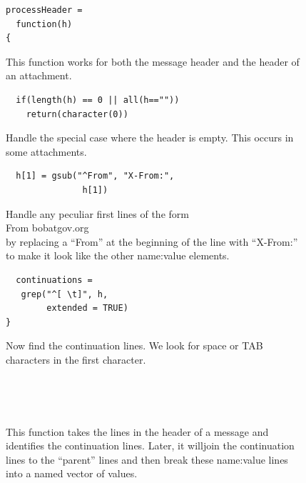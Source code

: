 \begin{figure}
\begin{minipage}{15cm}

\begin{minipage}[t]{9cm}
\begin{verbatim}
processHeader = 
  function(h)
{
\end{verbatim}
\end{minipage}
\begin{minipage}[t]{6cm}
{\footnotesize{
  This function works for both the message header and 
  the header of an attachment.
  \\
}}
\end{minipage}

\begin{minipage}[t]{9cm}
\begin{verbatim}
  if(length(h) == 0 || all(h==""))
    return(character(0))
\end{verbatim}
\end{minipage}
\begin{minipage}[t]{6cm}
{\footnotesize{
  Handle the special case where the header is empty.
  This occurs in some attachments.
\\
}}
\end{minipage}

\begin{minipage}[t]{9cm}
\begin{verbatim}
  h[1] = gsub("^From", "X-From:", 
               h[1])
\end{verbatim}
\end{minipage}
\begin{minipage}[t]{6cm}
{\footnotesize{
Handle any peculiar first lines of the form
 \\
 From bob{at}gov.org
 \\
 by replacing a ``From'' at the beginning of the 
 line with ``X-From:'' to make it look like the other 
 name:value elements.
\\
}}
\end{minipage}

\begin{minipage}[t]{9cm}
\begin{verbatim}
  continuations = 
   grep("^[ \t]", h, 
        extended = TRUE)
}
\end{verbatim}
\end{minipage}
\begin{minipage}[t]{6cm}
{\footnotesize{
Now find the continuation lines.
We look for space or TAB characters in the first character.
}}
\\
\end{minipage}
\\
\end{minipage}
\\

\caption{This function takes the lines in the header of a message and 
  identifies the continuation lines. Later, it willjoin the
  continuation lines to the ``parent'' lines and then break these 
  name:value lines into a named vector of values.
  }\label{fig:processHeader1}
\end{figure}

